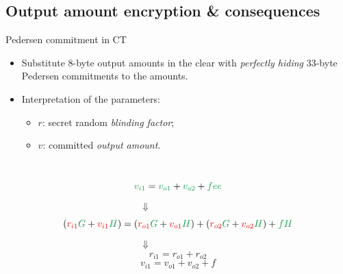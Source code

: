 \documentclass[usenames,dvipsnames]{beamer}
\begin{document}
    \subsection{Output amount encryption \& consequences}
    \begin{frame}{Pedersen commitment in CT}
        \begin{itemize}
            \item Substitute 8-byte output amounts in the clear with \textit{perfectly hiding} 33-byte Pedersen commitments to the amounts.
            \item Interpretation of the parameters:
            \begin{itemize}
                \item $r$: secret random \textit{blinding factor};
                \item $v$: committed \textit{output amount}.
            \end{itemize}
        \end{itemize}\\
        \begin{equation*}
            \color{ForestGreen}v_{i1} \color{black}= \color{ForestGreen}v_{o1} \color{black}+ \color{ForestGreen}v_{o2} \color{black}+ \color{ForestGreen}fee
        \end{equation*} 
        $\qquad \qquad \qquad \qquad \qquad \qquad \qquad \Downarrow$
        \begin{equation*}
            (\color{red}r_{i1}\color{ForestGreen}G \color{black}+ \color{red}v_{i1}\color{ForestGreen}H \color{black}) = (\color{red}r_{o1}\color{ForestGreen}G \color{black}+ \color{red}v_{o1}\color{ForestGreen}H \color{black}) + (\color{red}r_{o2}\color{ForestGreen}G \color{black}+ \color{red}v_{o2}\color{ForestGreen}H \color{black})+ \color{ForestGreen}fH
        \end{equation*}
        $\qquad \qquad \qquad \qquad \qquad \qquad \qquad \Downarrow$
        \begin{equation*}
            r_{i1} = r_{o1} + r_{o2}
        \end{equation*}
        \begin{equation*}
            v_{i1} = v_{o1} + v_{o2} + f
        \end{equation*}
    \end{frame}
    
        
\end{document}
